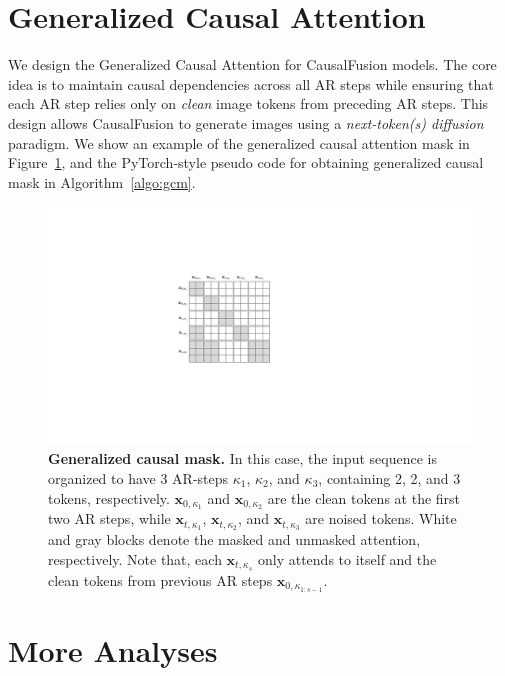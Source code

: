 
\appendix

\section{Generalized Causal Attention}\label{appendix:secA}
We design the Generalized Causal Attention for CausalFusion models. The core idea is to maintain causal dependencies across all AR steps while ensuring that each AR step relies only on \textit{clean} image tokens from preceding AR steps. This design allows CausalFusion to generate images using a \textit{next-token(s) diffusion} paradigm.
We show an example of the generalized causal attention mask in Figure~\ref{fig:generalized_causal_mask}, and the PyTorch-style pseudo code for obtaining generalized causal mask in Algorithm~\ref{algo:gcm}.

\begin{figure}[h]\centering
\includegraphics[width=0.7\linewidth]{figs/gca.pdf}
\vspace{-5pt}
\caption{\textbf{Generalized causal mask.} In this case, the input sequence is organized to have 3 AR-steps $\kappa_1$, $\kappa_2$, and $\kappa_3$, containing 2, 2, and 3 tokens, respectively. $\mathbf{x}_{0, \kappa_1}$ and $\mathbf{x}_{0, \kappa_2}$ are the clean tokens at the first two AR steps, while $\mathbf{x}_{t, \kappa_1}$, $\mathbf{x}_{t, \kappa_2}$, and $\mathbf{x}_{t, \kappa_3}$ are noised tokens. White and gray blocks denote the masked and unmasked attention, respectively. Note that, each $\mathbf{x}_{t, \kappa_s}$ only attends to itself and the clean tokens from previous AR steps $\mathbf{x}_{0, \kappa_{1:s-1}}$.}
\label{fig:generalized_causal_mask}
\end{figure}
\vspace{-10pt}


\section{More Analyses}\label{appendix:secB}
